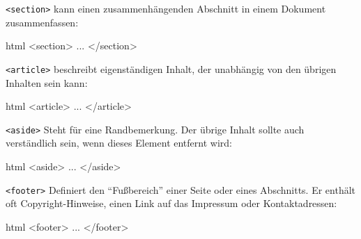 \documentclass[10pt,a4paper]{article}
\begin{document}
\begin{multicols}{3}
\texttt{<section>} kann einen zusammenhängenden Abschnitt in einem Dokument zusammenfassen:
\begin{codebox}{html}{}
<section> ... </section>
\end{codebox}

\texttt{<article>} beschreibt eigenständigen Inhalt, der unabhängig von den übrigen Inhalten sein kann:
\begin{codebox}{html}{}
<article> ... </article>
\end{codebox}

\texttt{<aside>} Steht für eine Randbemerkung. Der übrige Inhalt sollte auch verständlich sein, wenn dieses Element entfernt wird:
\begin{codebox}{html}{}
<aside> ... </aside>
\end{codebox}

\texttt{<footer>} Definiert den \enquote{Fußbereich} einer Seite oder eines Abschnitts. Er enthält oft Copyright-Hinweise, einen Link auf das Impressum oder Kontaktadressen:
\begin{codebox}{html}{}
<footer> ... </footer>
\end{codebox}




\printbibliography
{}
\end{multicols}
\end{document}

